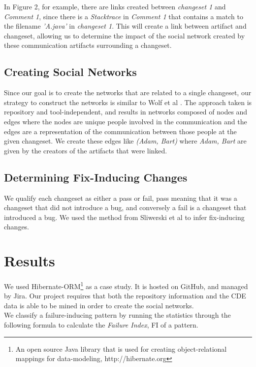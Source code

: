 \documentclass[conference]{IEEEtran}
\begin{document}
In Figure 2, for example, there are links created between \emph{changeset 1} and \emph{Comment 1}, since there is a \emph{Stacktrace} in \emph{Comment 1} that contains a match to the filename \emph{'A.java'} in \emph{changeset 1}.  This will create a link between artifact and changeset, allowing us to determine the impact of the social network created by these communication artifacts surrounding a changeset.

\subsection{Creating Social Networks} 
\label{sec:socialnetworks}
Since our goal is to create the networks that are related to a single changeset, our strategy to construct the networks is similar to Wolf et al \cite{4721184}.  The approach taken is repository and tool-independent, and results in networks composed of nodes and edges where the nodes are unique people involved in the communication and the edges are a representation of the communication between those people at the given changeset.  We create these edges like \emph{(Adam, Bart)} where \emph{Adam, Bart} are given by the creators of the artifacts that were linked.   

\subsection{Determining Fix-Inducing Changes}
We qualify each changeset as either a pass or fail, pass meaning that it was a changeset that did not introduce a bug, and conversely a fail is a changeset that introduced a bug.  We used the method from Sliwerski et al \cite{Sliwerski:2005:CIF:1083142.1083147} to infer fix-inducing changes. 

\section{Results}
We used Hibernate-ORM\footnote{An open source Java library that is used for creating object-relational mappings for data-modeling, http://hibernate.org} as a case study.  It is hosted on GitHub, and managed by Jira\footnotemark[2].  Our project requires that both the repository information and the CDE data is able to be mined in order to create the social networks.\\

We classify a failure-inducing pattern by running the statistics through the following formula to calculate the \emph{Failure Index}, FI of a pattern.\\
\end{document}
